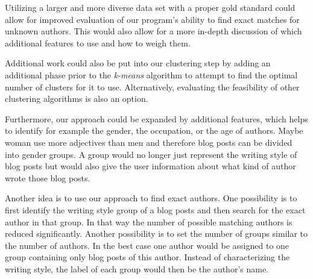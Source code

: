 Utilizing a larger and more diverse data set with a proper gold standard could allow for improved evaluation of our program’s ability to find exact matches for unknown authors.
This would also allow for a more in-depth discussion of which additional features to use and how to weigh them.


Additional work could also be put into our clustering step by adding an additional phase prior to the \textit{k-means} algorithm to attempt to find the optimal number of clusters for it to use.
Alternatively, evaluating the feasibility of other clustering algorithms is also an option.


Furthermore, our approach could be expanded by additional features, which helps to identify for example the gender, the occupation, or the age of authors.
Maybe woman use more adjectives than men and therefore blog posts can be divided into gender groups.
A group would no longer just represent the writing style of blog posts but would also give the user information about what kind of author wrote those blog posts.


Another idea is to use our approach to find exact authors.
One possibility is to first identify the writing style group of a blog posts and then search for the exact author in that group.
In that way the number of possible matching authors is reduced significantly.
Another possibility is to set the number of groups similar to the number of authors.
In the best case one author would be assigned to one group containing only blog posts of this author.
Instead of characterizing the writing style, the label of each group would then be the author's name.
